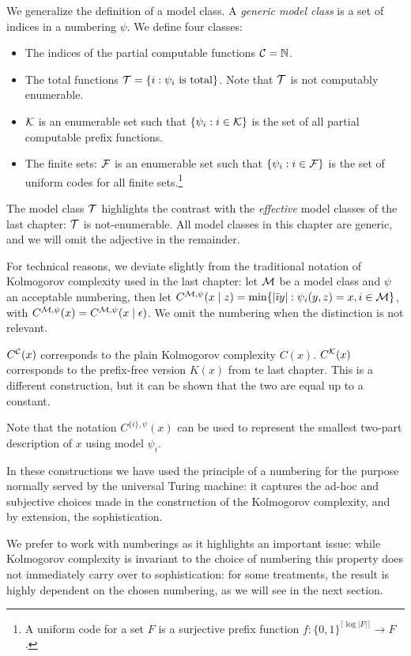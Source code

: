 
We generalize the definition of a model class. A \emph{generic model class} is a set of indices in a numbering $\psi$. We define four classes:
\begin{itemize} 
  \item The indices of the partial computable functions ${\cal C}={\mathbb N}$.
  \item The total functions ${\cal T}=\{i:\textnormal{$\psi_i$ is total}\}$. Note that ${\cal T}$ is not computably enumerable.
  \item ${\cal K}$ is an enumerable set such that $\{\psi_i:i\in{\cal K}\}$ is the set of all partial computable prefix functions.
  \item The finite sets: ${\cal F}$ is an enumerable set such that $\{\psi_i:i\in{\cal F}\}$ is the set of uniform codes for all finite sets.\footnote{A uniform code for a set $F$ is a surjective prefix function $f:\{0,1\}^{\lceil\log|F|\rceil}\to F$.}
\end{itemize}
The model class ${\cal T}$ highlights the contrast with the \emph{effective} model classes of the last chapter: ${\cal T}$ is not-enumerable. All model classes in this chapter are generic, and we will omit the adjective in the remainder.

For technical reasons, we deviate slightly from the traditional notation of Kolmogorov complexity used in the last chapter: let ${\cal M}$ be a model class and $\psi$ an acceptable numbering, then let $C^{{\cal M},\psi}(x\mid z)=\min\{|\bar\imath y|:\psi_i(y, z)=x,i\in{\cal M}\}$, with $C^{{\cal M},\psi}(x) = C^{{\cal M},\psi}(x\mid \epsilon)$. We omit the numbering when the distinction is not relevant. 

$C^{\cal C}(x)$ corresponds to the plain Kolmogorov complexity $C(x)$. $C^{\cal K}(x)$ corresponds to the prefix-free version $K(x)$ from te last chapter. This is a different construction, but it can be shown that the two are equal up to a constant.

Note that the notation $C^{\{i\}, \psi}(x)$ can be used to represent the smallest two-part description of $x$ using model $\psi_i$.

In these constructions we have used the principle of a numbering for the purpose normally served by the universal Turing machine: it captures the ad-hoc and subjective choices made in the construction of the Kolmogorov complexity, and by extension, the sophistication.

We prefer to work with numberings as it highlights an important issue: while Kolmogorov complexity is invariant to the choice of numbering this property does not immediately carry over to sophistication: for some treatments, the result is highly dependent on the chosen numbering, as we will see in the next section. 
 
